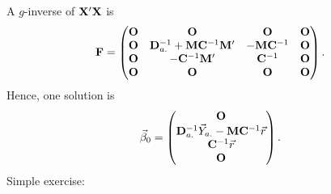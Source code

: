 A $ g $-inverse of $ \mathbf{X}'\mathbf{X} $ is
\[ \mathbf{F}=\begin{pmatrix}
        \mathbf{O} & \mathbf{O}                                                & \mathbf{O}                 & \mathbf{O} \\
        \mathbf{O} & \mathbf{D}_{a.}^{-1}+\mathbf{M}\mathbf{C}^{-1}\mathbf{M}' & -\mathbf{M}\mathbf{C}^{-1} & \mathbf{O} \\
        \mathbf{O} & -\mathbf{C}^{-1}\mathbf{M}'                               & \mathbf{C}^{-1}            & \mathbf{O} \\
        \mathbf{O} & \mathbf{O}                                                & \mathbf{O}                 & \mathbf{O} \\
    \end{pmatrix}. \]
Hence, one solution is
\[ \vec{\beta}_0=\begin{pmatrix}
        \mathbf{O}                                                              \\
        \mathbf{D}_{a.}^{-1}\vec{Y}_{a.}-\mathbf{M}\mathbf{C}^{-1}\vec{r} \\
        \mathbf{C}^{-1}\vec{r}                                               \\
        \mathbf{O}
    \end{pmatrix}. \]
Simple exercise:
